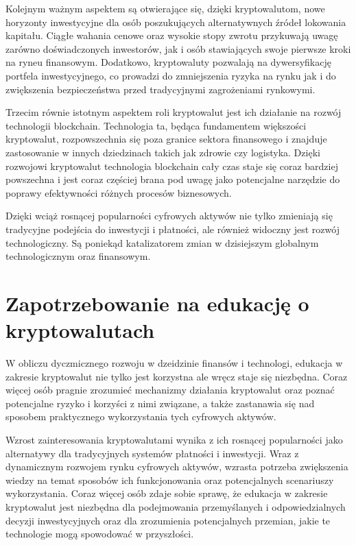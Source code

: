 Kolejnym ważnym aspektem są otwierające się, dzięki kryptowalutom, nowe horyzonty inwestycyjne dla osób poszukujących alternatywnych źródeł lokowania kapitału. Ciągłe wahania cenowe oraz wysokie stopy zwrotu przykuwają uwagę zarówno doświadczonych inwestorów, jak i osób stawiających swoje pierwsze kroki na ryneu finansowym. Dodatkowo, kryptowaluty pozwalają na dywersyfikację portfela inwestycyjnego, co prowadzi do zmniejszenia ryzyka na rynku jak i do zwiększenia bezpieczeństwa przed tradycyjnymi zagrożeniami rynkowymi.

Trzecim równie istotnym aspektem roli kryptowalut jest ich działanie na rozwój technologii blockchain. Technologia ta, będąca fundamentem większości kryptowalut, rozpowszechnia się poza granice sektora finansowego i znajduje zastosowanie w innych dziedzinach takich jak zdrowie czy logistyka. Dzięki rozwojowi kryptowalut technologia blockchain cały czas staje się coraz bardziej powszechna i jest coraz częściej brana pod uwagę jako potencjalne narzędzie do poprawy efektywności różnych procesów biznesowych.

Dzięki wciąż rosnącej popularności cyfrowych aktywów nie tylko zmieniają się tradycyjne podejścia do inwestycji i płatności, ale również widoczny jest rozwój technologiczny. Są poniekąd katalizatorem zmian w dzisiejszym globalnym technologicznym oraz finansowym.

\section{Zapotrzebowanie na edukację o kryptowalutach}
W obliczu dyczmicznego rozwoju w dzeidzinie finansów i technologi, edukacja w zakresie kryptowalut nie tylko jest korzystna ale wręcz staje się niezbędna. Coraz więcej osób pragnie zrozumieć mechanizmy działania kryptowalut oraz poznać potencjalne ryzyko i korzyści z nimi związane, a także zastanawia się nad sposobem praktycznego wykorzystania tych cyfrowych aktywów.

Wzrost zainteresowania kryptowalutami wynika z ich rosnącej popularności jako alternatywy dla tradycyjnych systemów płatności i inwestycji. Wraz z dynamicznym rozwojem rynku cyfrowych aktywów, wzrasta potrzeba zwiększenia wiedzy na temat sposobów ich funkcjonowania oraz potencjalnych scenariuszy wykorzystania. Coraz więcej osób zdaje sobie sprawę, że edukacja w zakresie kryptowalut jest niezbędna dla podejmowania przemyślanych i odpowiedzialnych decyzji inwestycyjnych oraz dla zrozumienia potencjalnych przemian, jakie te technologie mogą spowodować w przyszłości. 

